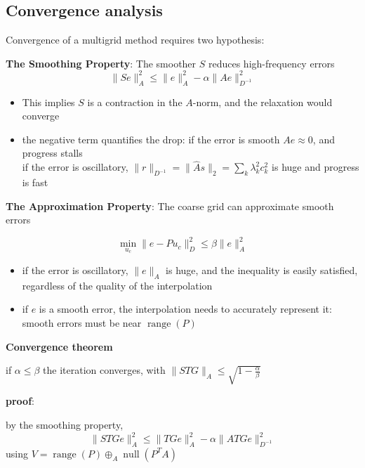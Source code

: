 \documentclass{article}
\DeclareMathOperator{\range}{range}
\DeclareMathOperator{\nul}{null}
\begin{document}
\subsection{Convergence analysis}

Convergence of a multigrid method requires two hypothesis:

\textbf{The Smoothing Property}: The smoother $S$ reduces high-frequency errors
\[
    \|S e\|_{A}^2 \le \|e\|_{A}^2 - \alpha \|A e\|_{D^{-1}}^2
\]

\begin{itemize}
    \item This implies $S$ is a contraction in the $A$-norm, and the relaxation would converge
    \item the negative term quantifies the drop: if the error is smooth $A e \approx 0$, and progress stalls \\
    if the error is oscillatory, $\|r\|_{D^{-1}} = \|\hat{A}s\|_{2} = \sum_{k}{\lambda_{k}^2c_{k}^{2}}$ is huge and progress is fast
\end{itemize}

\textbf{The Approximation Property}: The coarse grid can approximate smooth errors

\[
\min_{u_c} \|e - P u_c\|_D^2 \le \beta \|e\|_{A}^2
\]

\begin{itemize}
    \item if the error is oscillatory, $\|e\|_{A}$ is huge, and the inequality is easily satisfied, regardless of the quality of the interpolation
    \item if $e$ is a smooth error, the interpolation needs to accurately represent it: smooth errors must be near $\range(P)$
\end{itemize}


\textbf{Convergence theorem}

if $\alpha \le \beta$ the iteration converges, with $\| STG \|_A \le \sqrt{1 - \frac{\alpha}{\beta}}$

\textbf{proof}:

by the smoothing property,
\[
    \|S TGe\|_{A}^2 \le \|TGe\|_{A}^2 - \alpha \|A TGe\|_{D^{-1}}^2
\]
using $ V = \range{(P)} \oplus_{A} \nul(P^{T}A) $
\end{document}
